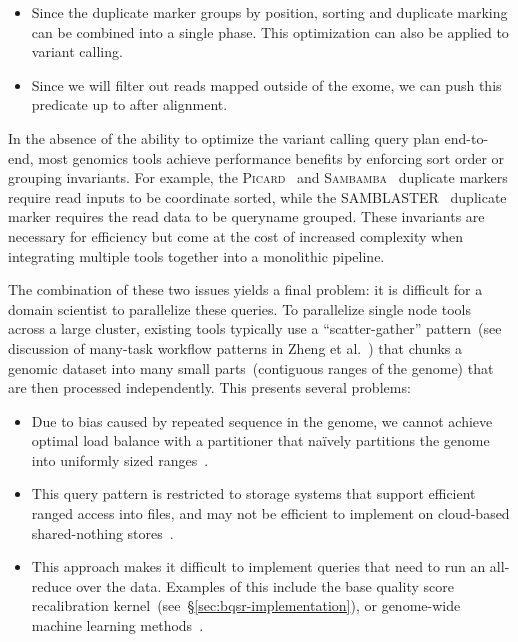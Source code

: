 \documentclass[phd]{ucbthesis}
\begin{document}
\begin{itemize}
\item Since the duplicate marker groups by position, sorting and duplicate
  marking can be combined into a single phase. This optimization can also be
  applied to variant calling.
\item Since we will filter out reads mapped outside of the exome, we can push
  this predicate up to after alignment.
\end{itemize}

In the absence of the ability to optimize the variant calling query plan
end-to-end, most genomics tools achieve performance benefits by enforcing
sort order or grouping invariants. For example, the
\textsc{Picard}~\cite{picard} and \textsc{Sambamba}~\cite{tarasov15}
duplicate markers require read inputs to be coordinate sorted, while the
\textsc{SAMBLASTER}~\cite{faust14} duplicate marker requires the read data to
be queryname grouped. These invariants are necessary for efficiency but come at
the cost of increased complexity when integrating multiple tools together into
a monolithic pipeline.

The combination of these two issues yields a final problem: it is difficult for
a domain scientist to parallelize these queries. To parallelize single node
tools across a large cluster, existing tools typically use a ``scatter-gather''
pattern~(see discussion of many-task workflow patterns in Zheng et
al.~\cite{zhang15, zhang16}) that chunks a genomic dataset into many small
parts~(contiguous ranges of the genome) that are then processed independently.
This presents several problems:

\begin{itemize}
\item Due to bias caused by repeated sequence in the genome, we cannot achieve
  optimal load balance with a partitioner that na\"{i}vely partitions the genome
  into uniformly sized ranges~\cite{chiang15}.
\item This query pattern is restricted to storage systems that support efficient
  ranged access into files, and may not be efficient to implement on cloud-based
  shared-nothing stores~\cite{vivian17}.
\item This approach makes it difficult to implement queries that need to run an
  all-reduce over the data. Examples of this include the base quality score
  recalibration kernel~(see~\S\ref{sec:bqsr-implementation}), or genome-wide
  machine learning methods~\cite{morrow17cks}.
\end{itemize}
  
\end{document}
